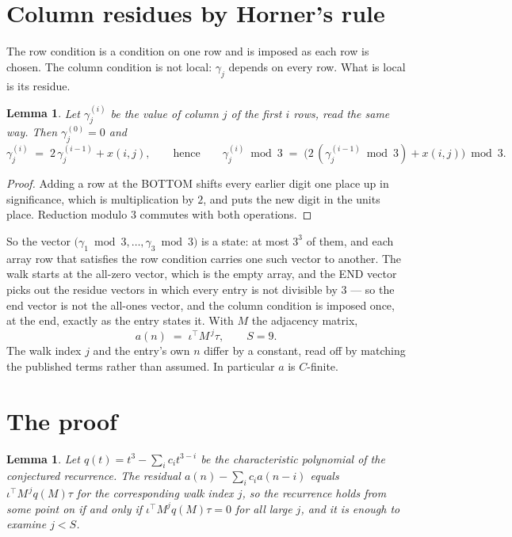 \documentclass[11pt,a4paper]{article}
\theoremstyle{plain}
\newtheorem{lemma}[theorem]{Lemma}
\theoremstyle{definition}
\begin{document}
\section{Column residues by Horner's rule}

The row condition is a condition on one row and is imposed as each row is chosen. The column
condition is not local: $\gamma_j$ depends on every row. What is local is its residue.

\begin{lemma}\label{lem:horner}
Let $\gamma_j^{(i)}$ be the value of column $j$ of the first $i$ rows, read the same way.
Then $\gamma_j^{(0)}=0$ and
\[
\gamma_j^{(i)}\;=\;2\,\gamma_j^{(i-1)}+x(i,j),
\qquad\text{hence}\qquad
\gamma_j^{(i)}\bmod 3\;=\;
\bigl(2\,(\gamma_j^{(i-1)}\bmod 3)+x(i,j)\bigr)\bmod 3 .
\]
\end{lemma}

\begin{proof}
Adding a row at the BOTTOM shifts every earlier digit one place up in significance, which is
multiplication by $2$, and puts the new digit in the units place. Reduction modulo
$3$ commutes with both operations.
\end{proof}

So the vector $\bigl(\gamma_1\bmod 3,\dots,\gamma_{3}\bmod
3\bigr)$ is a state: at most $3^{3}$ of them, and each array row
that satisfies the row condition carries one such vector to another. The walk starts at the
all-zero vector, which is the empty array, and the END vector picks out the residue vectors in
which every entry is not divisible by $3$ --- so the end vector is not the all-ones
vector, and the column condition is imposed once, at the end, exactly as the entry states it.
With $M$ the adjacency matrix,
\[
a(n)\;=\;\iota^{\!\top}M^{\,j}\tau ,\qquad S=9.
\]
The walk index $j$ and the entry's own $n$ differ by a constant, read off by matching the
published terms rather than assumed. In particular $a$ is $C$-finite.

\section{The proof}

\begin{lemma}\label{lem:crit}
Let $q(t)=t^{3}-\sum_i c_it^{3-i}$ be the characteristic polynomial of the
conjectured recurrence. The residual $a(n)-\sum_ic_ia(n-i)$ equals
$\iota^{\!\top}M^{\,j}q(M)\tau$ for the corresponding walk index $j$, so the recurrence
holds from some point on if and only if $\iota^{\!\top}M^{j}q(M)\tau=0$ for all large $j$,
and it is enough to examine $j<S$.
\end{lemma}
\end{document}

